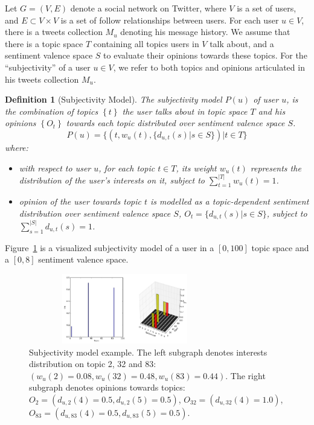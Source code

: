 \documentclass{acm_proc_article-sp}
\newtheorem{definition}{Definition}
\begin{document}
Let $G=\left( V,E \right) $ denote a social network on Twitter, where $ V $ is a set of users, and $ E\subset V\times V $ is a set of follow relationships between users. For each user $ u \in V $, there is a tweets collection $ M_{u} $ denoting his message history. We assume that there is a topic space $ T $ containing all topics users in $ V $ talk about, and a sentiment valence space $ S $ to evaluate their opinions towards these topics. 
For the ``subjectivity'' of a user $ u  \in V $, we refer to both topics and opinions articulated in his tweets collection $ M_{u} $.  
\begin{definition}[Subjectivity Model]
The subjectivity model $ P \left( u \right) $ of user $ u $, is the combination of topics $\left\lbrace  t \right\rbrace $ the user talks about in topic space $T$ and his opinions $\left\lbrace O_{t}\right\rbrace $ towards each topic distributed over sentiment valence space $ S $. 
\begin{equation}
\label{usermodel}
P \left( u \right) = \lbrace \left( t, w_{u} \left( t \right), \lbrace d_{u,t} \left( s \right)|s \in S \rbrace \right) |  t \in T \rbrace
\end{equation}
where:
\begin{itemize}
\item with respect to user $ u $, for each topic $t \in T$, its weight $ w_{u} \left( t \right)$ represents the distribution of the user's interests on it, subject to $ \sum_{t=1}^{|T|}w_{u} \left( t \right)=1 $.
\item opinion of the user towards topic $t$ is modelled as a topic-dependent sentiment distribution over sentiment valence space $ S $, $O_{t}=\lbrace d_{u,t} \left( s \right)|s \in S \rbrace $, subject to $ \sum_{s=1}^{|S|} d_{u,t} \left( s \right)=1$.
\end{itemize}
\end{definition}
Figure~\ref{fig0} is a visualized subjectivity model of a user in a $ [0,100] $ topic space and a $ [0,8] $ sentiment valence space. 
\begin{figure}[t]
\includegraphics[width=3.3in,height=1.2in]{fig1.pdf}
\caption{Subjectivity model example. The left subgraph denotes interests distribution on topic 2, 32 and 83: $ (  w_{u}\left( 2 \right)=0.08,w_{u}\left( 32 \right)=0.48, w_{u}\left( 83 \right)=0.44)  $. The right subgraph denotes opinions towards topics: $ O_{2}=( d_{u,2} \left( 4 \right)=0.5, d_{u,2} \left( 5 \right)=0.5)$, $O_{32}=(d_{u,32} \left( 4 \right)=1.0) $, $ O_{83}=( d_{u,83} \left( 4 \right)=0.5, d_{u,83} \left( 5 \right)=0.5 ) $.}
\label{fig0}
\end{figure}
\end{document}
